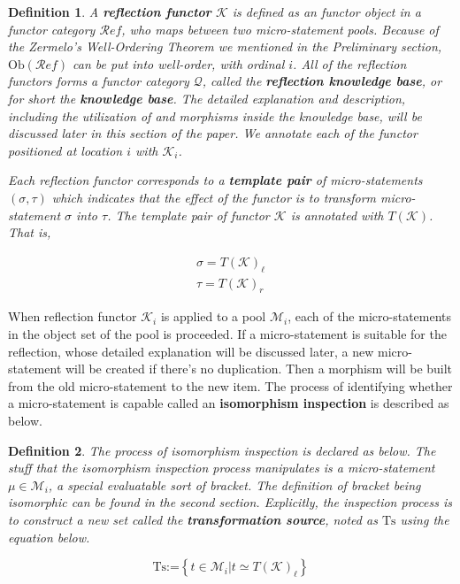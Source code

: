 \documentclass{aims}
\numberwithin{equation}{section}
\newtheorem{definition}{Definition}	%
\numberwithin{theorem}{section}	%
\numberwithin{axiom}{section}	%
\numberwithin{definition}{section}	%
\begin{document}
	\begin{definition}
		A \textbf{ reflection functor} \(\mathcal{K}\) is defined as an functor object in a functor category \(\mathcal{R}\mathit{e}\mathit{f}\), who maps between two micro-statement pools. Because of the Zermelo{'}s Well-Ordering Theorem we mentioned in the Preliminary section, \(\text{Ob}(\mathcal{R}\mathit{e}\mathit{f})\) can be put into well-order, with ordinal \(i\). All of the reflection functors forms a functor category \(\mathcal{Q}\), called the \textbf{ reflection knowledge base}, or for short the \textbf{ knowledge base}. The detailed explanation and description, including the utilization of and morphisms inside the knowledge base, will be discussed later in this section of the paper. We annotate each of the functor positioned at location \(i\) with \(\mathcal{K}_i\).
		
		Each reflection functor corresponds to a \textbf{ template pair} of micro-statements \((\sigma ,\tau )\) which indicates that the effect of the functor is to transform micro-statement \(\sigma\) into $\tau $. The template pair of functor \(\mathcal{K}\) is annotated with \(T(\mathcal{K})\). That
		is,
		
		\begin{equation}
			\begin{gathered}
				\sigma =T(\mathcal{K})_{\ell }\\
				\tau =T(\mathcal{K})_{\mathit{r}}
			\end{gathered}
		\end{equation}
	\end{definition}
	
	When reflection functor \(\mathcal{K}_i\) is applied to a pool \(\mathcal{M}_i\), each of the micro-statements in the object set of the pool is proceeded. If a micro-statement is suitable for the reflection, whose detailed explanation will be discussed later, a new micro-statement will be created if there{'}s no duplication. Then a morphism will be built from the old micro-statement to the new item. The process of identifying whether a micro-statement is capable called an \textbf{ isomorphism inspection} is described as below.
	
	\begin{definition}
		The process of isomorphism inspection is declared as below. The stuff that the isomorphism inspection process manipulates is a micro-statement \(\mu \in \mathcal{M}_i\), a special evaluatable sort of bracket. The definition of bracket being isomorphic can be found in the second section. Explicitly, the inspection process is to construct a new set called the \textbf{ transformation source}, noted as \(\text{Ts}\) using the equation below.
		
		\begin{equation}
			\text{Ts}\text{:=}\left\{t\in \mathcal{M}_i|t\simeq T(\mathcal{K})_{\ell }\right\}
		\end{equation}
	\end{definition}
	
\end{document}
